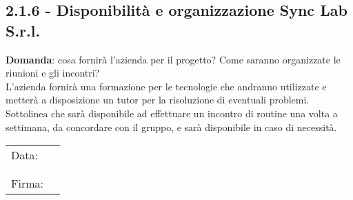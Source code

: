 \documentclass[italian,12pt]{article} %
\begin{document}
\begin{flushleft}
\subsection*{2.1.6 - Disponibilità e organizzazione Sync Lab S.r.l.}
	\textbf{Domanda}: cosa fornirà l'azienda per il progetto? Come saranno organizzate le riunioni e gli incontri?\\
	L'azienda fornirà una formazione per le tecnologie che andranno utilizzate e metterà a disposizione un tutor per la risoluzione di eventuali problemi. Sottolinea che sarà disponibile ad effettuare un incontro di routine una volta a settimana, da concordare con il gruppo, e sarà disponibile in caso di necessità. 

\end{flushleft}

\begin{table}[b]
	\begin{tabular}{@{}p{.5in}p{4in}@{}}
		Data:  & \hrulefill \\
			   &     		\\
			   &     		\\
		Firma: & \hrulefill \\
	\end{tabular}
	\end{table}
\end{document}
